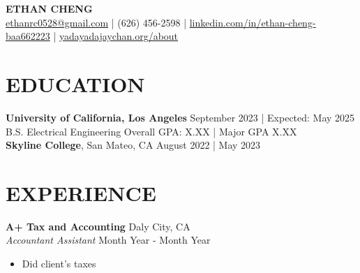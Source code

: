 \documentclass[letterpaper,9pt]{extarticle}
\begin{document}

\begin{center}
\textbf{\Large ETHAN CHENG}\\[2pt]
	\href{mailto:ethanrc0528@gmail.com}{ethanrc0528@gmail.com} | (626) 456-2598 | \href{https://www.linkedin.com/in/ethan-cheng-baa662223}{linkedin.com/in/ethan-cheng-baa662223} | \href{http://www.yadayadajaychan.org/about/}{yadayadajaychan.org/about}
\end{center}

\section*{EDUCATION}
\noindent
\textbf{University of California, Los Angeles} \hfill September 2023 | Expected: May 2025\\
B.S. Electrical Engineering \hfill Overall GPA: X.XX | Major GPA X.XX\\ %

\noindent
\textbf{Skyline College}, San Mateo, CA \hfill August 2022 | May 2023

\section*{EXPERIENCE}
\noindent
\textbf{A+ Tax and Accounting} \hfill Daly City, CA\\ %
\textit{Accountant Assistant} \hfill Month Year - Month Year %
\begin{itemize}
	\item Did client's taxes
\end{itemize}

%
\end{document}
